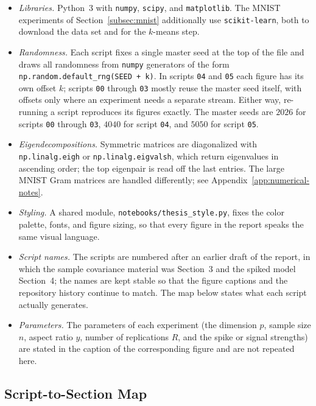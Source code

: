 \begin{itemize}
  \item \emph{Libraries.} Python~3 with \texttt{numpy}, \texttt{scipy}, and \texttt{matplotlib}. The MNIST experiments of Section~\ref{subsec:mnist} additionally use \texttt{scikit-learn}, both to download the data set and for the \(k\)-means step.
  \item \emph{Randomness.} Each script fixes a single master seed at the top of the file and draws all randomness from \texttt{numpy} generators of the form \texttt{np.random.default\_rng(SEED + k)}. In scripts \texttt{04} and \texttt{05} each figure has its own offset \(k\); scripts \texttt{00} through \texttt{03} mostly reuse the master seed itself, with offsets only where an experiment needs a separate stream. Either way, re-running a script reproduces its figures exactly. The master seeds are \(2026\) for scripts \texttt{00} through \texttt{03}, \(4040\) for script \texttt{04}, and \(5050\) for script \texttt{05}.
  \item \emph{Eigendecompositions.} Symmetric matrices are diagonalized with \texttt{np.linalg.eigh} or \texttt{np.linalg.eigvalsh}, which return eigenvalues in ascending order; the top eigenpair is read off the last entries. The large MNIST Gram matrices are handled differently; see Appendix~\ref{app:numerical-notes}.
  \item \emph{Styling.} A shared module, \texttt{notebooks/thesis\_style.py}, fixes the color palette, fonts, and figure sizing, so that every figure in the report speaks the same visual language.
  \item \emph{Script names.} The scripts are numbered after an earlier draft of the report, in which the sample covariance material was Section~3 and the spiked model Section~4; the names are kept stable so that the figure captions and the repository history continue to match. The map below states what each script actually generates.
  \item \emph{Parameters.} The parameters of each experiment (the dimension \(p\), sample size \(n\), aspect ratio \(y\), number of replications \(R\), and the spike or signal strengths) are stated in the caption of the corresponding figure and are not repeated here.
\end{itemize}

\subsection{Script-to-Section Map}\label{app:script-map}

